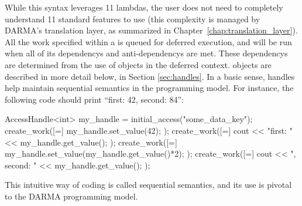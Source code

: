 While this syntax leverages \CC{}11 \glspl{lambda}, the user does not need to
completely understand \CC{}11 standard features to use 
(this complexity is managed by DARMA's \gls{translation layer}, as summarized in
Chapter~\ref{chap:translation_layer}). All the work specified within a
 is queued for deferred execution, and will be run when
all of its \glspl{dependency} and \glspl{anti-dependency} are met.  
These \glspl{dependency} are determined from the use of 
 objects in the \gls{deferred context}. 
 objects are described in more detail below, in
Section \ref{sec:handles}.  In a basic sense, \glspl{handle} help maintain
\gls{sequential semantics} in the \gls{programming model}.  For instance, the
following code should print ``first: 42, second: 84'':
\begin{CppCode}
AccessHandle<int> my_handle = initial_access("some_data_key");
create_work([=]{
  my_handle.set_value(42);
});
create_work([=]{
  cout << "first: " << my_handle.get_value();
});
create_work([=]{
  my_handle.set_value(my_handle.get_value()*2);
});
create_work([=]{
  cout << ", second: " << my_handle.get_value();
});
\end{CppCode}
This intuitive way of coding is called \gls{sequential semantics}, 
and its use is pivotal to the DARMA \gls{programming model}.

%
%
%
%
%
%
%
%

